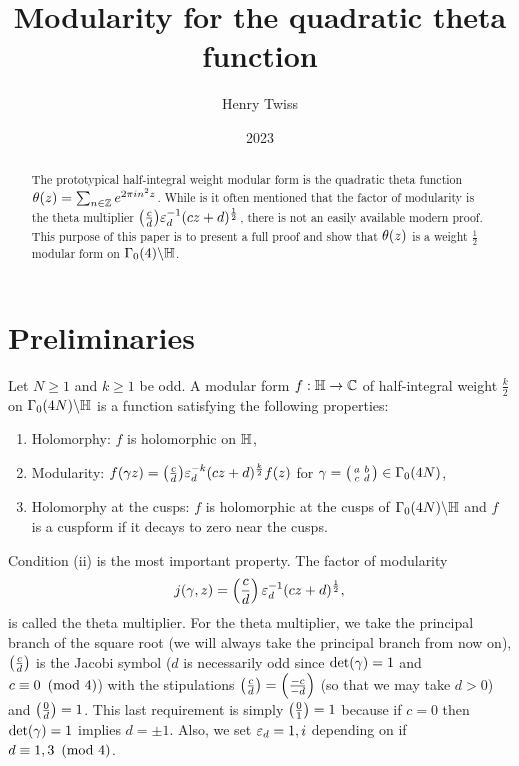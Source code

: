 \documentclass[12pt,reqno,oneside]{amsart}
\title{Modularity for the quadratic theta function}
\author{Henry Twiss}
\date{2023}
\begin{document}
\begin{abstract}
    The prototypical half-integral weight modular form is the quadratic theta function $\theta(z) = \sum_{n \in \mathbb{Z}}e^{2\pi in^{2}z}$. While is it often mentioned that the factor of modularity is the theta multiplier $\textstyle{\left(\frac{c}{d}\right)}\varepsilon_{d}^{-1}(cz+d)^{\frac{1}{2}}$, there is not an easily available modern proof. This purpose of this paper is to present a full proof and show that $\theta(z)$ is a weight $\frac{1}{2}$ modular form on $\Gamma_{0}(4)\backslash\mathbb{H}$.
\end{abstract}

\maketitle

\section{Preliminaries}
    Let $N \ge 1$ and $k \ge 1$ be odd. A modular form $f:\mathbb{H} \to \mathbb{C}$ of half-integral weight $\frac{k}{2}$ on $\Gamma_{0}(4N)\backslash\mathbb{H}$ is a function satisfying the following properties:
    \begin{enumerate}[label=(\roman*)]
        \item Holomorphy: $f$ is holomorphic on $\mathbb{H}$,
        \item Modularity: $f(\gamma z) = \textstyle{\left(\frac{c}{d}\right)}\varepsilon_{d}^{-k}(cz+d)^{\frac{k}{2}}f(z)$ for $\gamma = \begin{psmallmatrix} a & b \\ c & d \end{psmallmatrix} \in \Gamma_{0}(4N)$,
        \item Holomorphy at the cusps: $f$ is holomorphic at the cusps of $\Gamma_{0}(4N)\backslash\mathbb{H}$ and $f$ is a cuspform if it decays to zero near the cusps.
    \end{enumerate}
    Condition (ii) is the most important property. The factor of modularity
    \[
        j(\gamma,z) = \left(\frac{c}{d}\right)\varepsilon_{d}^{-1}(cz+d)^{\frac{1}{2}},
    \]
    is called the theta multiplier. For the theta multiplier, we take the principal branch of the square root (we will always take the principal branch from now on), $\left(\frac{c}{d}\right)$ is the Jacobi symbol ($d$ is necessarily odd since $\det(\gamma) = 1$ and $c \equiv 0 \ \left(\text{mod }4\right)$) with the stipulations $\left(\frac{c}{d}\right) = \left(\frac{-c}{-d}\right)$ (so that we may take $d > 0$) and $\left(\frac{0}{d}\right) = 1$. This last requirement is simply $\left(\frac{0}{1}\right) = 1$ because if $c = 0$ then $\det(\gamma) = 1$ implies $d = \pm 1$. Also, we set $\varepsilon_{d} = 1,i$ depending on if $d \equiv 1,3 \ \left(\text{mod }4\right)$.
    
\end{document}

